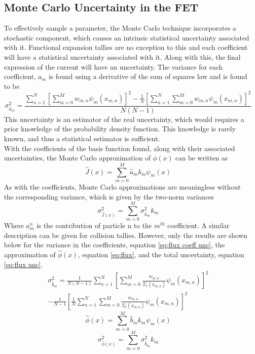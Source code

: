 \documentclass[10tma4paper]{article}
\begin{document}
\subsection{Monte Carlo Uncertainty in the FET}\label{UIC}

To effectively sample a parameter, the Monte Carlo technique incorporates a stochastic component, which causes an intrinsic statistical uncertainty associated with it. Functional expansion tallies are no exception to this and each coefficient will have a statistical uncertainty associated with it. Along with this, the final expression of the current will have an uncertainty. The variance for each coefficient, $a_{m}$ is found using a derivative of the sum of squares law and is found to be 
	\begin{equation} \label{eq:coeff unc}
	\sigma_{\hat{a}_{m}}^2 = \frac{\sum_{n=1}^{N}[\sum_{m=0}^{M}w_{m,n}\psi_{m}(x_{m,n})]^{2} - \frac{1}{N}[ \sum_{n=1}^{N}\sum_{m=0}^{M}w_{m,n}\psi_{m}(x_{m,n})]^{2}}{N(N-1)}
	\end{equation}
This uncertainty is an estimator of the real uncertainty, which would requires a prior knowledge of the probability density function. This knowledge is rarely known, and thus a statistical estimator is sufficient.
\\With the coefficients of the basis function found, along with their associated uncertainties, the Monte Carlo approximation of $\phi(x)$ can be written as
	\begin{equation} \label{eq:current hat}
	\hat{J}(x) = \sum_{m=0}^{M} \hat{a}_{m}k_{m}\psi_{m}(x)
	\end{equation}
As with the coefficients, Monte Carlo approximations are meaningless without the corresponding variance, which is given by the two-norm variances
	\begin{equation} \label{eq:current unc}
	\sigma_{\hat{J}(x)}^2=\sum_{m=0}^{M}\sigma_{\hat{a}_{m}}^2k_{m}
	\end{equation}
Where $a_{m}^{n}$ is the contribution of particle n to the $m^{th}$ coefficient. A similar description can be given for collision tallies. However, only the results are shown below for the variance in the coefficients, equation \eqref{eq:flux coeff unc}, the approximation of $\hat{\phi}(x)$, equation \eqref{eq:flux}, and the total uncertainty, equation \eqref{eq:flux unc}.
		\begin{equation} \label{eq:flux coeff unc}
		\begin{split}	
		\sigma_{\hat{b}_{m}}^2 = \frac{1}{N(N-1)} \sum_{n=1}^{N}[\sum_{m=0}^{M}\frac{w_{m,n}}{\Sigma_{t}(x_{m,n})}\psi_{m}(x_{m,n})]^{2}\\ -
		\frac{1}{N-1}[\frac{1}{N} \sum_{n=1}^{N}\sum_{m=0}^{M}\frac{w_{m,n}}{\Sigma_{t}(x_{m,n})}\psi_{m}(x_{m,n})]^{2}
		\end{split}	
		\end{equation}
		\begin{equation} \label{eq:flux}
		\hat{\phi}(x)= \sum_{m=0}^{M}\hat{b}_{m}k_{m}\psi_{m}(x)
		\end{equation}
		\begin{equation} \label{eq:flux unc}
		\sigma_{\hat{\phi}(x)}^2=\sum_{m=0}^{M}\sigma_{\hat{b}_{m}}^2k_{m}
		\end{equation}
\end{document}
